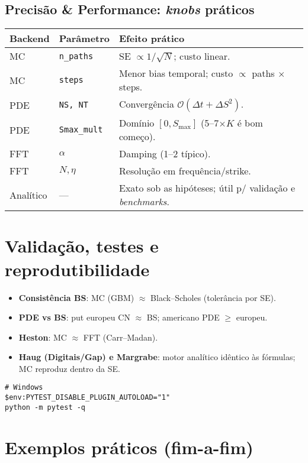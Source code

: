 ﻿\documentclass[11pt,a4paper]{article}
\begin{document}
\subsection{Precisão \& Performance: \emph{knobs} práticos}
\begin{center}
\begin{tabular}{@{}llp{7.5cm}@{}}
\toprule
Backend & Parâmetro & Efeito prático \\
\midrule
MC & \texttt{n\_paths} & SE $\propto 1/\sqrt{N}$; custo linear. \\
MC & \texttt{steps} & Menor bias temporal; custo $\propto$ paths $\times$ steps. \\
PDE & \texttt{NS, NT} & Convergência $\mathcal O(\Delta t + \Delta S^2)$. \\
PDE & \texttt{Smax\_mult} & Domínio $[0,S_{\max}]$ (5–7$\times K$ é bom começo). \\
FFT & $\alpha$ & Damping (1–2 típico). \\
FFT & $N,\eta$ & Resolução em frequência/strike. \\
Analítico & --- & Exato sob as hipóteses; útil p/ validação e \emph{benchmarks}. \\
\bottomrule
\end{tabular}
\end{center}

\section{Validação, testes e reprodutibilidade}
\begin{itemize}[leftmargin=1.2em]
\item \textbf{Consistência BS}: MC (GBM) $\approx$ Black--Scholes (tolerância por SE).
\item \textbf{PDE vs BS}: put europeu CN $\approx$ BS; americano PDE $\ge$ europeu.
\item \textbf{Heston}: MC $\approx$ FFT (Carr--Madan).
\item \textbf{Haug (Digitais/Gap) e Margrabe}: motor analítico idêntico às fórmulas; MC reproduz dentro da SE.
\end{itemize}
\begin{verbatim}
# Windows
$env:PYTEST_DISABLE_PLUGIN_AUTOLOAD="1"
python -m pytest -q
\end{verbatim}

\section{Exemplos práticos (fim-a-fim)}
\end{document}

